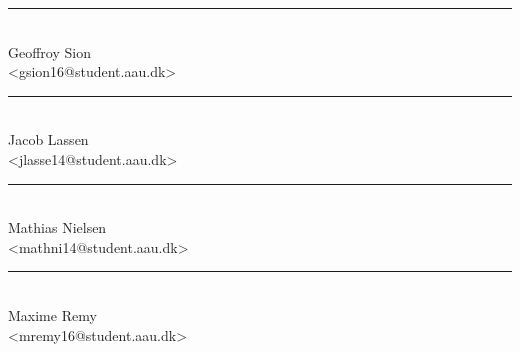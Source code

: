 \begin{center}
\begin{minipage}[b]{0.45\textwidth}
 \centering
 \rule{\textwidth}{0.5pt}\\
  Geoffroy Sion\\
 {\footnotesize <gsion16@student.aau.dk>}
\end{minipage}
\begin{minipage}[b]{0.45\textwidth}
 \centering
 \rule{\textwidth}{0.5pt}\\
  Jacob Lassen\\
 {\footnotesize <jlasse14@student.aau.dk>}
\end{minipage}
\hspace{0.3cm}

\end{center}
\vspace{3\baselineskip}
\begin{center}

\begin{minipage}[b]{0.45\textwidth}
 \centering
 \rule{\textwidth}{0.5pt}\\
  Mathias Nielsen\\
 {\footnotesize <mathni14@student.aau.dk>}
\end{minipage}
\hspace{0.3cm}
\begin{minipage}[b]{0.45\textwidth}
 \centering
 \rule{\textwidth}{0.5pt}\\
  Maxime Remy\\
 {\footnotesize <mremy16@student.aau.dk>}
\end{minipage}

\end{center}
\vspace{3\baselineskip}
